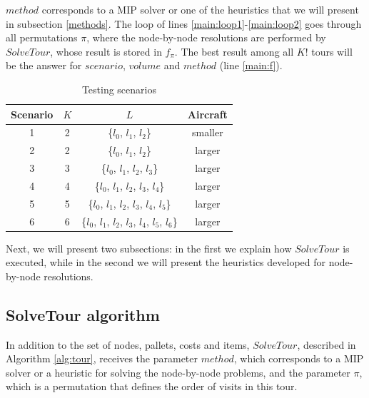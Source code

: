 \documentclass[preprint,authoryear]{elsarticle}
\begin{document}
$method$\/ corresponds to a MIP solver or one of the heuristics that we will present in subsection \ref{methods}. The loop of lines \ref{main:loop1}-\ref{main:loop2} goes through all permutations $\pi$, where the node-by-node resolutions are performed by $SolveTour$, whose result is stored in $f_{\pi}$. The best result among all $K!$\/ tours will be the answer for $scenario$, $volume$\/ and $method$\/ (line \ref{main:f}). 

\vspace{2.0mm}
\begin{table}[H]
	\centering
	\caption{Testing scenarios}  \label{tab:scenarios}
	\begin{tabular}{c c c c }
		\toprule
		{\bf Scenario} & {$K$} & {$L$} & {\bf Aircraft} \\		
		\midrule
		1 & 2    & \{$l_0$, $l_1$, $l_2$\}                                 & smaller \\
		2 & 2    & \{$l_0$, $l_1$, $l_2$\}                                 & larger  \\
		3 & 3    & \{$l_0$, $l_1$, $l_2$, $l_3$\}                          & larger  \\
		4 & 4    & \{$l_0$, $l_1$, $l_2$, $l_3$, $l_4$\}                   & larger  \\
		5 & 5    & \{$l_0$, $l_1$, $l_2$, $l_3$, $l_4$, $l_5$\}            & larger  \\
		6 & 6    & \{$l_0$, $l_1$, $l_2$, $l_3$, $l_4$, $l_5$, $l_6$\}     & larger  \\
		\bottomrule
	\end{tabular}
\end{table}

Next, we will present two subsections: in the first we explain how $SolveTour$ is executed, while in the second we will present the heuristics developed for node-by-node resolutions.


\subsection{SolveTour algorithm}
\label{tour}

In addition to the set of nodes, pallets, costs and items, $SolveTour$, described in Algorithm \ref{alg:tour}, receives the parameter $method$, which corresponds to a MIP solver or a heuristic for solving the node-by-node problems, and the parameter $\pi$, which is a permutation that defines the order of visits in this tour.
\end{document}
